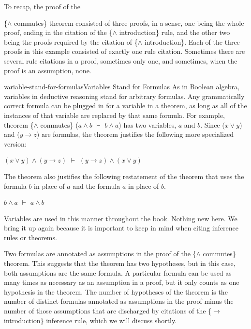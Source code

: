 To recap, the proof of the {\{$\wedge$ commutes\} theorem
consisted of three proofs, in a sense,
one being the whole proof, ending in the citation of
the \{$\wedge$ introduction\} rule,
and the other two being the proofs required by the citation of \{$\wedge$ introduction\}.
Each of the three proofs in this example consisted of exactly one rule citation.
Sometimes there are several rule citations in a proof, sometimes only one,
and sometimes, when the proof is an assumption, none.

\begin{aside}{variable-stand-for-formulas}{Variables Stand for Formulas}
As in Boolean algebra, variables in deductive reasoning
stand for arbitrary formulas.
Any grammatically correct formula
can be plugged in for a variable in a theorem,
as long as all of the instances of that variable are
replaced by that same formula.
For example,
theorem \{$\wedge$ commutes\} ($a \wedge b$ $\vdash$ $b \wedge a$)
has two variables, $a$ and $b$.
Since ($x \vee y$) and ($y \rightarrow z$) are formulas,
the theorem justifies the following more specialized
version:
\begin{center}
$(x \vee y) \wedge (y \rightarrow z)$ $\vdash$ $(y \rightarrow z) \wedge (x \vee y)$
\end{center}
The theorem also justifies the following restatement of the
theorem that uses the formula $b$ in place of $a$ and the formula $a$ in place of $b$.
\begin{center}
$b \wedge a$ $\vdash$ $a \wedge b$
\end{center}
Variables are used in this manner throughout the book. Nothing new here.
We bring it up again because it is important
to keep in mind when citing inference rules
or theorems.
\end{aside}

Two formulas are annotated as assumptions in the
proof of the \{$\wedge$ commutes\} theorem.
This suggests that the theorem has
two hypotheses,
but in this case, both assumptions are the same formula.
A particular formula can be used as many times as necessary as
an assumption in a proof, but it only counts as one hypothesis
in the theorem.
The number of hypotheses
of the theorem is the number of distinct
formulas annotated as assumptions in the proof
minus the number of those assumptions that are discharged
by citations of the \{$\rightarrow$ introduction\} inference rule,
which we will discuss shortly.

}
